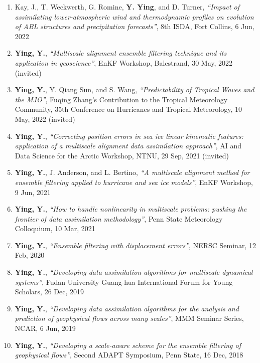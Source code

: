 \begin{enumerate}
\item Kay, J., T. Weckwerth, G. Romine, \textbf{Y. Ying}, and D. Turner, \textit{``Impact of assimilating lower‐atmospheric wind and thermodynamic profiles on evolution of ABL structures and precipitation forecasts''}, 8th ISDA, Fort Collins,  6 Jun, 2022

\item \textbf{Ying, Y.}, \textit{``Multiscale alignment ensemble filtering technique and its application in geoscience''}, EnKF Workshop, Balestrand, 30 May, 2022
(invited)

\item \textbf{Ying, Y.}, Y. Qiang Sun, and S. Wang, \textit{``Predictability of Tropical Waves and the MJO''}, Fuqing Zhang’s Contribution to the Tropical Meteorology Community, 35th Conference on Hurricanes and Tropical Meteorology, 10 May, 2022
(invited)

\item \textbf{Ying, Y.}, \textit{``Correcting position errors in sea ice linear kinematic features: application of a multiscale alignment data assimilation approach''}, AI and Data Science for the Arctic Workshop, NTNU, 29 Sep, 2021
(invited)

\item \textbf{Ying, Y.}, J. Anderson, and L. Bertino, \textit{``A multiscale alignment method for ensemble filtering applied to hurricane and sea ice models''}, EnKF Workshop,  9 Jun, 2021

\item \textbf{Ying, Y.}, \textit{``How to handle nonlinearity in multiscale problems: pushing the frontier of data assimilation methodology''}, Penn State Meteorology Colloquium, 10 Mar, 2021

\item \textbf{Ying, Y.}, \textit{``Ensemble filtering with displacement errors''}, NERSC Seminar, 12 Feb, 2020

\item \textbf{Ying, Y.}, \textit{``Developing data assimilation algorithms for multiscale dynamical systems''}, Fudan University Guang-hua International Forum for Young Scholars, 26 Dec, 2019

\item \textbf{Ying, Y.}, \textit{``Developing data assimilation algorithms for the analysis and prediction of geophysical flows across many scales''}, MMM Seminar Series, NCAR,  6 Jun, 2019

\item \textbf{Ying, Y.}, \textit{``Developing a scale-aware scheme for the ensemble filtering of geophysical flows''}, Second ADAPT Symposium, Penn State, 16 Dec, 2018


\end{enumerate}
